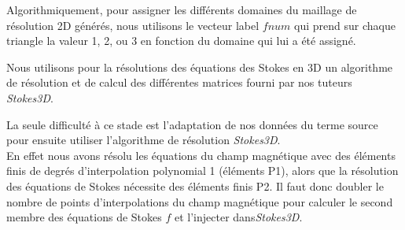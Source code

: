 \documentclass[a4paper,12pt,titlepage]{report}
\begin{document}
\begin{onehalfspace}
\newpage
Algorithmiquement, pour assigner les différents domaines du maillage de résolution 2D générés, nous utilisons le vecteur label $fnum$ qui prend sur chaque triangle la valeur 1, 2, ou 3 en fonction du domaine qui lui a été assigné.
\newline




Nous utilisons pour la résolutions des équations des Stokes en 3D un algorithme de résolution et de calcul des différentes matrices fourni par nos tuteurs \textit{Stokes3D}.
\newline  	

La seule difficulté à ce stade est l'adaptation de nos données du terme source pour ensuite utiliser l'algorithme de résolution \textit{Stokes3D}. \\
En effet nous avons résolu les équations du champ magnétique avec des éléments finis de degrés d'interpolation polynomial 1 (éléments P1), alors que la résolution des équations de Stokes nécessite des éléments finis P2. Il faut donc doubler le nombre de points d'interpolations du champ magnétique pour calculer le second membre des équations de Stokes $f$ et l'injecter dans\textit{Stokes3D}.\\


\end{onehalfspace}
\end{document}
